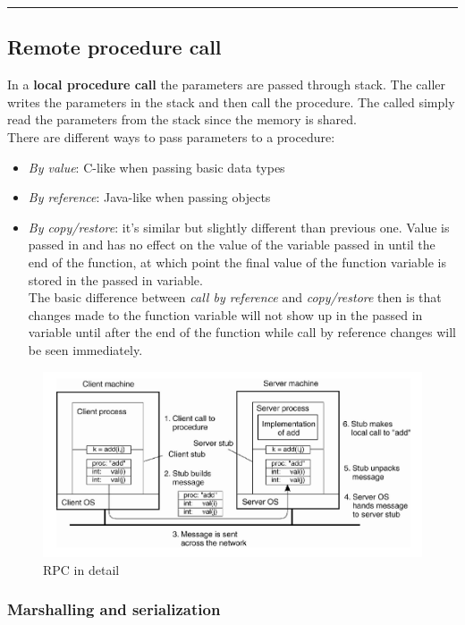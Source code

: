 \begin{center}\rule{3in}{0.4pt}\end{center}

\subsection{Remote procedure call}
In a \textbf{local procedure call} the parameters are passed through stack. The caller writes the parameters in the stack and then call the procedure. The called simply read the parameters from the stack since the memory is shared.\\
There are different ways to pass parameters to a procedure:
\begin{itemize}
    \item \textit{By value}: C-like when passing basic data types
    \item \textit{By reference}: Java-like when passing objects
    \item \textit{By copy/restore}: it's similar but slightly different than previous one. Value is passed in and has no effect on the value of the variable passed in until the end of the function, at which point the final value of the function variable is stored in the passed in variable.\\
    The basic difference between \textit{call by reference} and \textit{copy/restore} then is that changes made to the function variable will not show up in the passed in variable until after the end of the function while call by reference changes will be seen immediately.
\end{itemize}

\begin{figure}[h]
\caption{RPC in detail}
\includegraphics[width=\textwidth]{src/images/rpc-in-detail.png}
\centering
\end{figure}

\subsubsection{Marshalling and serialization}

